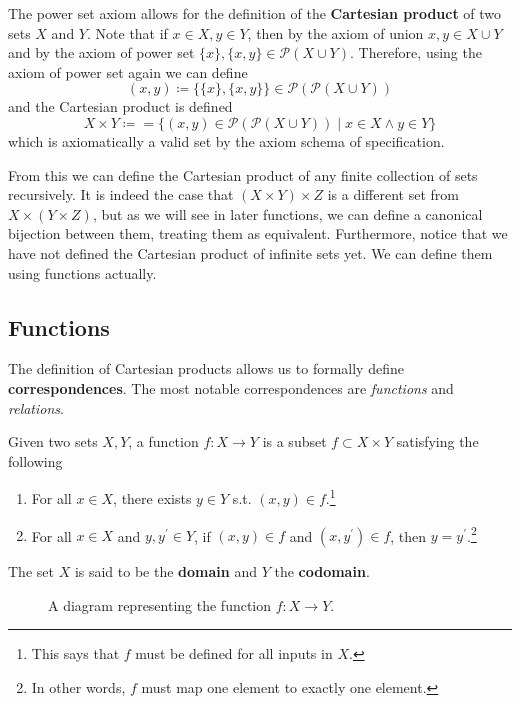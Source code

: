   \begin{definition}
    The power set axiom allows for the definition of the \textbf{Cartesian product} of two sets $X$ and $Y$. Note that if $x \in X, y \in Y$, then by the axiom of union $x, y \in X \cup Y$ and by the axiom of power set $\{x\}, \{x, y\} \in \mathcal{P}(X \cup Y)$. Therefore, using the axiom of power set again we can define
    \begin{equation}
      (x, y) \coloneqq \{\{x\}, \{x, y\}\} \in \mathcal{P}(\mathcal{P}(X \cup Y))
    \end{equation} 
    and the Cartesian product is defined 
    \begin{equation}
      X \times Y \coloneqq = \{ (x, y) \in \mathcal{P}(\mathcal{P}(X \cup Y))  \mid x \in X \land y \in Y \}
    \end{equation}
    which is axiomatically a valid set by the axiom schema of specification. 
  \end{definition} 

  From this we can define the Cartesian product of any finite collection of sets recursively. It is indeed the case that $(X \times Y) \times Z$ is a different set from $X \times (Y \times Z)$, but as we will see in later functions, we can define a canonical bijection between them, treating them as equivalent. Furthermore, notice that we have not defined the Cartesian product of infinite sets yet. We can define them using functions actually. 

\subsection{Functions} 

  The definition of Cartesian products allows us to formally define \textbf{correspondences}. The most notable correspondences are \textit{functions} and \textit{relations}. 

  \begin{definition}[Function]
    Given two sets $X, Y$, a function $f: X \rightarrow Y$ is a subset $f \subset X \times Y$ satisfying the following
    \begin{enumerate}
      \item For all $x \in X$, there exists $y \in Y$ s.t. $(x, y) \in f$.\footnote{This says that $f$ must be defined for all inputs in $X$.}
      \item For all $x \in X$ and $y, y^\prime \in Y$, if $(x, y) \in f$ and $(x, y^\prime) \in f$, then $y = y^\prime$.\footnote{In other words, $f$ must map one element to exactly one element.} 
    \end{enumerate}
    The set $X$ is said to be the \textbf{domain} and $Y$ the \textbf{codomain}. 

    \begin{figure}[H]
      \centering 
      \caption{A diagram representing the function $f: X \rightarrow Y$.} 
      \label{fig:function at}
    \end{figure}
  \end{definition}  

